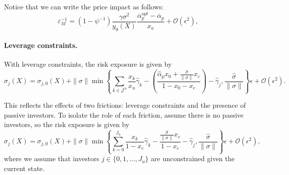 Notice that we can write the price impact as follows:
\begin{equation}
	\varepsilon_M^{-1}=\left(1-\psi^{-1}\right) \frac{\gamma \sigma^{2}}{y_{0}(X)}\frac{\overline{\alpha}_p^{opt}-\overline{\alpha}_{p}}{x_{a}}+\mathcal{O}\left(\epsilon^{2}\right),\label{eq:price-impact-het-misallocation}
\end{equation}

\paragraph{Leverage constraints.} With leverage constraints, the risk exposure is given by
\begin{equation}
    \sigma_j(X) = \sigma_{j,0}(X) +\|\sigma\|\min\left\{ \sum_{k\in\mathcal{J}^u} \frac{x_k}{x_u} \hat{\gamma}_k -\left(\frac{\hat{\alpha}_p  x_0+\frac{\hat{\sigma}}{\|\sigma\|} x_c }{1-x_0-x_c}\right)- \hat{\gamma}_j  ,\frac{\hat{\sigma}}{\|\sigma\|}  \right\}\epsilon + \mathcal{O}(\epsilon^2).
\end{equation}

This reflects the effects of two frictions: leverage constraints and the presence of passive investors. To isolate the role of each friction, assume there is no passive investors, so the risk exposure is given by 
\begin{equation}
    \sigma_j(X) = \sigma_{j,0}(X) +\|\sigma\|\min\left\{ \sum_{k=0}^{J_u} \frac{x_k}{1-x_c} \hat{\gamma}_k -\frac{\frac{\hat{\sigma}}{\|\sigma\|} x_c }{1-x_c}- \hat{\gamma}_j  ,\frac{\hat{\sigma}}{\|\sigma\|}  \right\}\epsilon + \mathcal{O}(\epsilon^2),
\end{equation}
where we assume that investors $j \in \{0, 1,\ldots, J_u\}$ are unconstrained given the current state.

